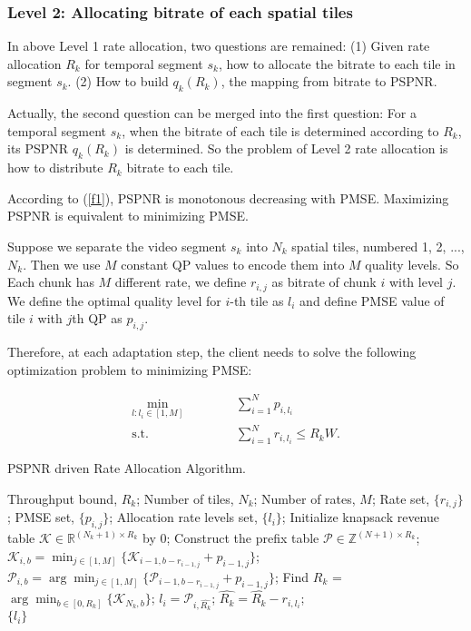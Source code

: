 \subsubsection{Level 2: Allocating bitrate of each spatial tiles}

In above Level 1 rate allocation, two questions are remained: (1) Given rate allocation $R_k$ for temporal segment $s_k$, how to allocate the bitrate to each tile in segment $s_k$. (2) How to build $q_k(R_k)$, the mapping from bitrate to PSPNR. 

Actually, the second question can be merged into the first question: For a temporal segment $s_k$, when the bitrate of each tile is determined according to $R_k$, its PSPNR $q_k(R_k)$ is determined. So the problem of Level 2 rate allocation is how to distribute $R_k$ bitrate to each tile.

According to (\ref{f1}), PSPNR is monotonous decreasing with PMSE. Maximizing PSPNR is equivalent to minimizing PMSE.

Suppose we separate the video segment $s_k$ into $N_k$ spatial tiles, numbered 1, 2, ..., $N_k$. Then we use $M$ constant QP values to encode them into $M$ quality levels. So Each chunk has $M$ different rate, we define $r_{i, j}$ as bitrate of chunk $i$ with level $j$. We define the optimal quality level for $i$-th tile as $l_i$ and define PMSE value of tile $i$ with $j$th QP as $p_{i, j}$.

Therefore, at each adaptation step, the client needs to solve the following optimization problem to minimizing PMSE:

\begin{equation}
\begin{aligned}
\min_{l: l_i \in [1, M]} \text{~~~~~~} & \text{~~~~} \sum_{i = 1}^N p_{i, l_i} \\
\text{s.t.} \text{~~~~} & \text{~~~~}\sum_{i=1}^N r_{i,l_i} \le R_kW.
\end{aligned}
\end{equation}

\begin{algorithm}[t]
\caption{ PSPNR driven Rate Allocation Algorithm.}
\label{alg:Framwork}
\begin{algorithmic}[1]
\Require
Throughput bound, $R_k$;
Number of tiles, $N_k$;
Number of rates, $M$;
Rate set, $\{r_{i,j}\}$;
PMSE set, $\{p_{i,j}\}$;
\Ensure
Allocation rate levels set, $\{l_i\}$;
\State Initialize knapsack revenue table $\mathcal{K}\in \mathbb{R}^{(N_k+1)\times R_k}$ by 0;
\State Construct the prefix table $\mathcal{P}\in \mathbb{Z}^{(N+1)\times R_k}$;
    \State $\mathcal{K}_{i,b} = \min_{j\in[1,M]}\{\mathcal{K}_{i-1,b-r_{i-1,j}} + p_{i-1,j}\}$;
    \State $\mathcal{P}_{i,b} = \arg\min_{j\in[1,M]}\{\mathcal{P}_{i-1,b-r_{i-1,j}} + p_{i-1,j}\}$;
  \EndFor
\EndFor
\State Find $\hat{R_k}$ = $\arg\min_{b\in [0,R_k]} \{\mathcal{K}_{N_k,b}\}$;
  \State $l_i = \mathcal{P}_{i,\hat{R_k}}$;
  \State $\hat{R_k} = \hat{R_k} - r_{i,l_i}$;
\EndFor \\
\Return $\{l_i\}$
\end{algorithmic}
\end{algorithm}

